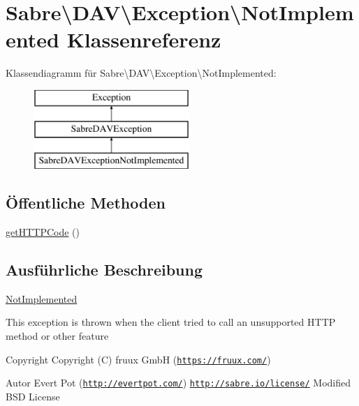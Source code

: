 \hypertarget{class_sabre_1_1_d_a_v_1_1_exception_1_1_not_implemented}{}\section{Sabre\textbackslash{}D\+AV\textbackslash{}Exception\textbackslash{}Not\+Implemented Klassenreferenz}
\label{class_sabre_1_1_d_a_v_1_1_exception_1_1_not_implemented}
Klassendiagramm für Sabre\textbackslash{}D\+AV\textbackslash{}Exception\textbackslash{}Not\+Implemented\+:\begin{figure}[H]
\begin{center}
\leavevmode
\includegraphics[height=3.000000cm]{class_sabre_1_1_d_a_v_1_1_exception_1_1_not_implemented}
\end{center}
\end{figure}
\subsection*{Öffentliche Methoden}
\begin{DoxyCompactItemize}
\item 
\mbox{\hyperlink{class_sabre_1_1_d_a_v_1_1_exception_1_1_not_implemented_aeed59f93343d505ca00d20720f179c8b}{get\+H\+T\+T\+P\+Code}} ()
\end{DoxyCompactItemize}


\subsection{Ausführliche Beschreibung}
\mbox{\hyperlink{class_sabre_1_1_d_a_v_1_1_exception_1_1_not_implemented}{Not\+Implemented}}

This exception is thrown when the client tried to call an unsupported H\+T\+TP method or other feature

\begin{DoxyCopyright}{Copyright}
Copyright (C) fruux GmbH (\href{https://fruux.com/}{\tt https\+://fruux.\+com/}) 
\end{DoxyCopyright}
\begin{DoxyAuthor}{Autor}
Evert Pot (\href{http://evertpot.com/}{\tt http\+://evertpot.\+com/})  \href{http://sabre.io/license/}{\tt http\+://sabre.\+io/license/} Modified B\+SD License 
\end{DoxyAuthor}


